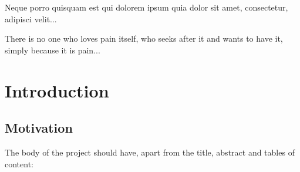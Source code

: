 \begin{savequote}[8cm]
\textlatin{Neque porro quisquam est qui dolorem ipsum quia dolor sit amet, consectetur, adipisci velit...}

There is no one who loves pain itself, who seeks after it and wants to have it, simply because it is pain...
\end{savequote}

\chapter{\label{ch:1-intro}Introduction} 

\minitoc

\section{Motivation}

The body of the project should have, apart from the title, abstract and tables of content:

